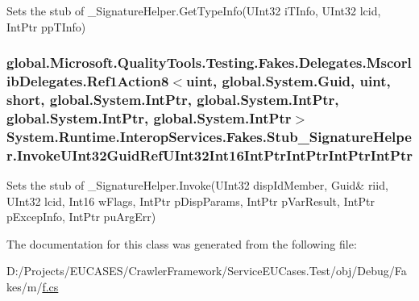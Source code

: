 Sets the stub of \-\_\-\-Signature\-Helper.\-Get\-Type\-Info(\-U\-Int32 i\-T\-Info, U\-Int32 lcid, Int\-Ptr pp\-T\-Info)

\hypertarget{class_system_1_1_runtime_1_1_interop_services_1_1_fakes_1_1_stub___signature_helper_aae0b51ea635f79e560dc61da8e35c03a}{
\subsubsection[{Invoke\-U\-Int32\-Guid\-Ref\-U\-Int32\-Int16\-Int\-Ptr\-Int\-Ptr\-Int\-Ptr\-Int\-Ptr}]{\setlength{\rightskip}{0pt plus 5cm}global.\-Microsoft.\-Quality\-Tools.\-Testing.\-Fakes.\-Delegates.\-Mscorlib\-Delegates.\-Ref1\-Action8$<$uint, global.\-System.\-Guid, uint, short, global.\-System.\-Int\-Ptr, global.\-System.\-Int\-Ptr, global.\-System.\-Int\-Ptr, global.\-System.\-Int\-Ptr$>$ System.\-Runtime.\-Interop\-Services.\-Fakes.\-Stub\-\_\-\-Signature\-Helper.\-Invoke\-U\-Int32\-Guid\-Ref\-U\-Int32\-Int16\-Int\-Ptr\-Int\-Ptr\-Int\-Ptr\-Int\-Ptr}}\label{class_system_1_1_runtime_1_1_interop_services_1_1_fakes_1_1_stub___signature_helper_aae0b51ea635f79e560dc61da8e35c03a}


Sets the stub of \-\_\-\-Signature\-Helper.\-Invoke(U\-Int32 disp\-Id\-Member, Guid\& riid, U\-Int32 lcid, Int16 w\-Flags, Int\-Ptr p\-Disp\-Params, Int\-Ptr p\-Var\-Result, Int\-Ptr p\-Excep\-Info, Int\-Ptr pu\-Arg\-Err)



The documentation for this class was generated from the following file\-:\begin{DoxyCompactItemize}
\item 
D\-:/\-Projects/\-E\-U\-C\-A\-S\-E\-S/\-Crawler\-Framework/\-Service\-E\-U\-Cases.\-Test/obj/\-Debug/\-Fakes/m/\hyperlink{m_2f_8cs}{f.\-cs}\end{DoxyCompactItemize}
